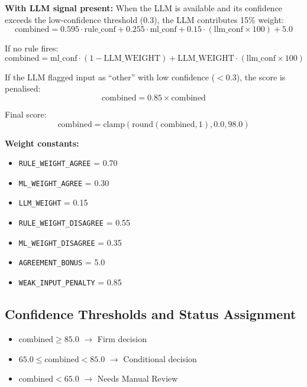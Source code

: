 \documentclass[10pt]{article}
\begin{document}
\textbf{With LLM signal present:} When the LLM is available and its confidence exceeds the low-confidence threshold (0.3), the LLM contributes 15\% weight:
\begin{equation}
\text{combined} = 0.595 \cdot \text{rule\_conf} + 0.255 \cdot \text{ml\_conf} + 0.15 \cdot (\text{llm\_conf} \times 100) + 5.0
\end{equation}

If no rule fires:
\begin{equation}
\text{combined} = \text{ml\_conf} \cdot (1 - \text{LLM\_WEIGHT}) + \text{LLM\_WEIGHT} \cdot (\text{llm\_conf} \times 100)
\end{equation}

If the LLM flagged input as ``other'' with low confidence (\(< 0.3\)), the score is penalised:
\begin{equation}
\text{combined} = 0.85 \times \text{combined}
\end{equation}

Final score:
\begin{equation}
\text{combined} = \text{clamp}(\text{round}(\text{combined}, 1), 0.0, 98.0)
\end{equation}

\textbf{Weight constants:}
\begin{itemize}
    \item \texttt{RULE\_WEIGHT\_AGREE} = 0.70
    \item \texttt{ML\_WEIGHT\_AGREE} = 0.30
    \item \texttt{LLM\_WEIGHT} = 0.15
    \item \texttt{RULE\_WEIGHT\_DISAGREE} = 0.55
    \item \texttt{ML\_WEIGHT\_DISAGREE} = 0.35
    \item \texttt{AGREEMENT\_BONUS} = 5.0
    \item \texttt{WEAK\_INPUT\_PENALTY} = 0.85
\end{itemize}

\subsection{Confidence Thresholds and Status Assignment}

\begin{itemize}
    \item \(\text{combined} \geq 85.0\) \(\rightarrow\) Firm decision
    \item \(65.0 \leq \text{combined} < 85.0\) \(\rightarrow\) Conditional decision
    \item \(\text{combined} < 65.0\) \(\rightarrow\) Needs Manual Review
\end{itemize}
\end{document}

